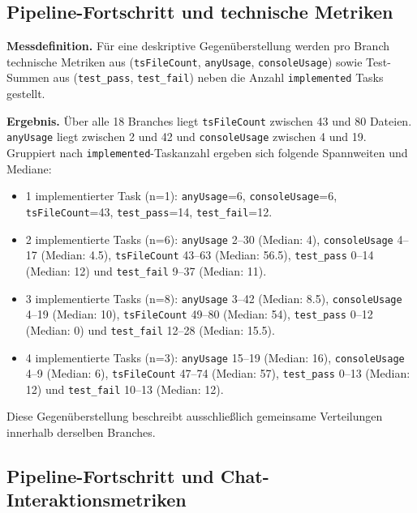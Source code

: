 \subsection{Pipeline-Fortschritt und technische Metriken}
\label{sec:results_triangulation_quality}

\begin{sloppypar}
{\bfseries Messdefinition.} Für eine deskriptive Gegenüberstellung werden pro Branch technische Metriken aus  (\texttt{tsFileCount}, \texttt{anyUsage}, \texttt{consoleUsage}) sowie Test-Summen aus  (\texttt{test\_pass}, \texttt{test\_fail}) neben die Anzahl \texttt{implemented} Tasks gestellt.
\end{sloppypar}

{\bfseries Ergebnis.} Über alle 18 Branches liegt \texttt{tsFileCount} zwischen 43 und 80 Dateien. \texttt{anyUsage} liegt zwischen 2 und 42 und \texttt{consoleUsage} zwischen 4 und 19.
Gruppiert nach \texttt{implemented}-Taskanzahl ergeben sich folgende Spannweiten und Mediane:
\begin{itemize}
    \item 1 implementierter Task (n=1): \texttt{anyUsage}=6, \texttt{consoleUsage}=6, \texttt{tsFileCount}=43, \texttt{test\_pass}=14, \texttt{test\_fail}=12.
    \item 2 implementierte Tasks (n=6): \texttt{anyUsage} 2--30 (Median: 4), \texttt{consoleUsage} 4--17 (Median: 4.5), \texttt{tsFileCount} 43--63 (Median: 56.5), \texttt{test\_pass} 0--14 (Median: 12) und \texttt{test\_fail} 9--37 (Median: 11).
    \item 3 implementierte Tasks (n=8): \texttt{anyUsage} 3--42 (Median: 8.5), \texttt{consoleUsage} 4--19 (Median: 10), \texttt{tsFileCount} 49--80 (Median: 54), \texttt{test\_pass} 0--12 (Median: 0) und \texttt{test\_fail} 12--28 (Median: 15.5).
    \item 4 implementierte Tasks (n=3): \texttt{anyUsage} 15--19 (Median: 16), \texttt{consoleUsage} 4--9 (Median: 6), \texttt{tsFileCount} 47--74 (Median: 57), \texttt{test\_pass} 0--13 (Median: 12) und \texttt{test\_fail} 10--13 (Median: 12).
\end{itemize}
Diese Gegenüberstellung beschreibt ausschließlich gemeinsame Verteilungen innerhalb derselben Branches.

\subsection{Pipeline-Fortschritt und Chat-Interaktionsmetriken}
\label{sec:results_triangulation_chat}

